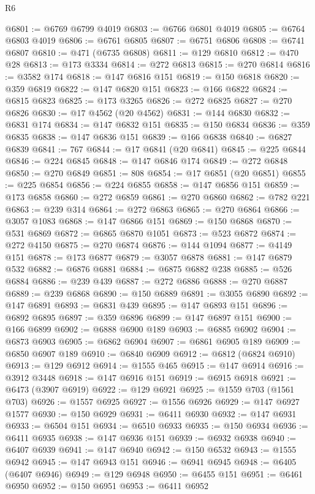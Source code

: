 \begin{lexlean}{R6}
\begin{coremodule}
@6801 := @6769 @6799 @4019
@6803 := @6766 @6801 @4019
@6805 := @6764 @6803 @4019
@6806 := @6761 @6805
@6807 := @6751 @6806
@6808 := @6741 @6807
@6810 := @471 (@6735 @6808)
@6811 := @129 @6810
@6812 := @470 @28
@6813 := @173 @3334
@6814 := @272 @6813
@6815 := @270 @6814
@6816 := @3582 @174
@6818 := @147 @6816 @151
@6819 := @150 @6818
@6820 := @359 @6819
@6822 := @147 @6820 @151
@6823 := @166 @6822
@6824 := @6815 @6823
@6825 := @173 @3265
@6826 := @272 @6825
@6827 := @270 @6826
@6830 := @17 @4562 (@20 @4562)
@6831 := @144 @6830
@6832 := @6831 @174
@6834 := @147 @6832 @151
@6835 := @150 @6834
@6836 := @359 @6835
@6838 := @147 @6836 @151
@6839 := @166 @6838
@6840 := @6827 @6839
@6841 := 767
@6844 := @17 @6841 (@20 @6841)
@6845 := @225 @6844
@6846 := @224 @6845
@6848 := @147 @6846 @174
@6849 := @272 @6848
@6850 := @270 @6849
@6851 := 808
@6854 := @17 @6851 (@20 @6851)
@6855 := @225 @6854
@6856 := @224 @6855
@6858 := @147 @6856 @151
@6859 := @173 @6858
@6860 := @272 @6859
@6861 := @270 @6860
@6862 := @782 @221
@6863 := @239 @314
@6864 := @272 @6863
@6865 := @270 @6864
@6866 := @3057 @1083
@6868 := @147 @6866 @151
@6869 := @150 @6868
@6870 := @531 @6869
@6872 := @6865 @6870 @1051
@6873 := @523 @6872
@6874 := @272 @4150
@6875 := @270 @6874
@6876 := @144 @1094
@6877 := @4149 @151
@6878 := @173 @6877
@6879 := @3057 @6878
@6881 := @147 @6879 @532
@6882 := @6876 @6881
@6884 := @6875 @6882 @238
@6885 := @526 @6884
@6886 := @239 @439
@6887 := @272 @6886
@6888 := @270 @6887
@6889 := @239 @6868
@6890 := @150 @6889
@6891 := @3055 @6890
@6892 := @147 @6891
@6893 := @6831 @439
@6895 := @147 @6893 @151
@6896 := @6892 @6895
@6897 := @359 @6896
@6899 := @147 @6897 @151
@6900 := @166 @6899
@6902 := @6888 @6900 @189
@6903 := @6885 @6902
@6904 := @6873 @6903
@6905 := @6862 @6904
@6907 := @6861 @6905 @189
@6909 := @6850 @6907 @189
@6910 := @6840 @6909
@6912 := @6812 (@6824 @6910)
@6913 := @129 @6912
@6914 := @1555 @465
@6915 := @147 @6914
@6916 := @3912 @3448
@6918 := @147 @6916 @151
@6919 := @6915 @6918
@6921 := @6473 (@3907 @6919)
@6922 := @129 @6921
@6925 := @1559 @703 (@1561 @703)
@6926 := @1557 @6925
@6927 := @1556 @6926
@6929 := @147 @6927 @1577
@6930 := @150 @6929
@6931 := @6411 @6930
@6932 := @147 @6931
@6933 := @6504 @151
@6934 := @6510 @6933
@6935 := @150 @6934
@6936 := @6411 @6935
@6938 := @147 @6936 @151
@6939 := @6932 @6938
@6940 := @6407 @6939
@6941 := @147 @6940
@6942 := @150 @6532
@6943 := @1555 @6942
@6945 := @147 @6943 @151
@6946 := @6941 @6945
@6948 := @6405 (@6407 @6946)
@6949 := @129 @6948
@6950 := @6455 @151
@6951 := @6461 @6950
@6952 := @150 @6951
@6953 := @6411 @6952

\end{coremodule}
\end{lexlean}
